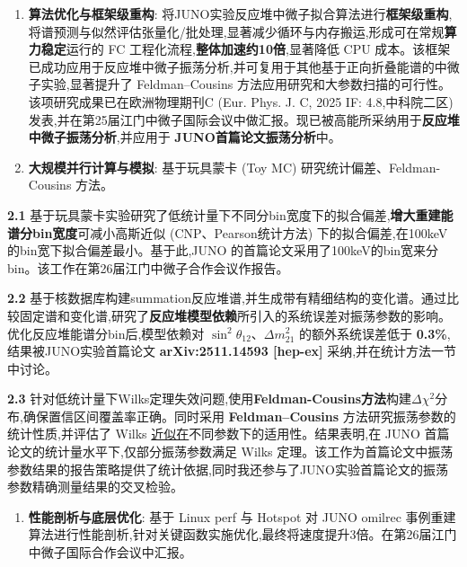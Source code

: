 \documentclass[a4paper,10.5pt]{article}
\newcommand{\projitem}[3]{%
    \item[\textbf{\color{themered}#1.}] \textcolor{themered}{\textbf{#2}}: #3
}
\newcommand{\subproj}[2]{%
    \par\vspace{2pt}\noindent\textbf{#1} #2\par
}
\begin{document}
\begin{enumerate}[leftmargin=1.6em]
    \projitem{1}{算法优化与\textcolor{themered}{框架级重构}}{将JUNO实验反应堆中微子拟合算法进行\textbf{框架级重构},\textcolor{themered}{将谱预测}与似然评估张量化/批处理,显著减少循环与内存搬运,形成可在常规\textbf{算力稳定}运行的 FC 工程化流程,\textbf{整体加速约10倍},显著降低 CPU 成本。该框架已成功应用于反应堆中微子振荡分析,并可复用于其他基于正向折叠能谱的中微子实验,显著提升了 Feldman--Cousins 方法应用研究和大参数扫描的可行性。该项研究成果已在欧洲物理期刊C (Eur. Phys. J. C, 2025 IF: 4.8,中科院二区)发表,并在第25届江门中微子国际会议中做汇报。现已被高能所采纳用于\textbf{反应堆中微子振荡分析},并应用于 \textbf{JUNO首篇论文振荡分析}中。}

    \projitem{2}{大规模并行计算与模拟}{基于玩具蒙卡 (Toy MC) 研究统计偏差、Feldman-Cousins 方法。}
\end{enumerate}

\subproj{2.1}{基于玩具蒙卡实验研究了低统计量下不同分bin宽度下的拟合偏差,\textbf{增大重建能谱分bin宽度}可减小高斯近似 (CNP、Pearson统计方法) 下的拟合偏差,在100keV的bin宽下拟合偏差最小。基于此,JUNO 的首篇论文采用了100keV的bin宽来分bin。该工作在第26届江门中微子合作会议作报告。}

\subproj{2.2}{基于核数据库构建summation反应堆谱,并生成带有精细结构的变化谱。通过比较固定谱和变化谱,研究了\textbf{反应堆模型依赖}所引入的系统误差对振荡参数的影响。优化反应堆能谱分bin后,模型依赖对 $\sin^2\theta_{12}$、$\Delta m_{21}^2$ 的额外系统误差低于 \textbf{0.3\%},结果被JUNO实验首篇论文 \textbf{arXiv:2511.14593 [hep-ex]} 采纳,并在统计方法一节中讨论。}

\subproj{2.3}{针对低统计量下Wilks定理失效问题,使用\textbf{Feldman-Cousins方法}构建$\Delta\chi^2$分布,确保置信区间覆盖率正确。同时采用 \textbf{Feldman--Cousins} 方法研究振荡参数的统计性质,并评估了 Wilks \underline{近似在}不同参数下的适用性。结果表明,在 JUNO 首篇论文的统计量水平下,仅部分振荡参数满足 Wilks 定理。该工作为首篇论文中振荡参数结果的报告策略提供了统计依据,同时我还参与了JUNO实验首篇论文的振荡参数精确测量结果的交叉检验。}

\vspace{4pt}
\begin{enumerate}[leftmargin=1.6em,start=3]
    \projitem{3}{性能剖析与底层优化}{基于 Linux perf 与 Hotspot 对 JUNO omilrec 事例重建算法进行性能剖析,针对关键函数实施优化,最终将速度提升3倍。在第26届江门中微子国际合作会议中汇报。}
\end{enumerate}

\end{document}
